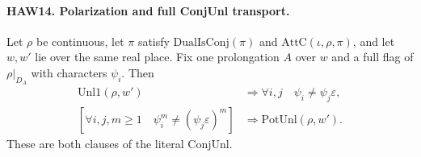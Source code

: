 \documentclass[11pt,a4paper]{article}
\numberwithin{equation}{section}
\theoremstyle{remark}\newtheorem{remark}[theorem]{Remark}
\begin{document}
\paragraph{HAW14. Polarization and full ConjUnl transport.}
\label{claim:HAW14}
Let $\rho$ be continuous, let $\pi$ satisfy
$\mathrm{DualIsConj}(\pi)$ and $\mathrm{AttC}(\iota,\rho,\pi)$,
and let $w,w'$ lie over the same real place.  Fix one
prolongation $A$ over $w$ and a full flag of $\rho|_{D_A}$
with characters $\psi_i$.  Then
\[
 \begin{split}
 \mathrm{Unl1}(\rho,w')&\Longrightarrow
                         \forall i,j\quad\psi_i\ne\psi_j\varepsilon,\\
 [\forall i,j, m\ge1\quad\psi_i^m\ne(\psi_j\varepsilon)^m]
                 &\Longrightarrow\mathrm{PotUnl}(\rho,w').
 \end{split}
 \tag{HAW.20}
\]
These are both clauses of the literal $\mathrm{ConjUnl}$.
\end{document}
